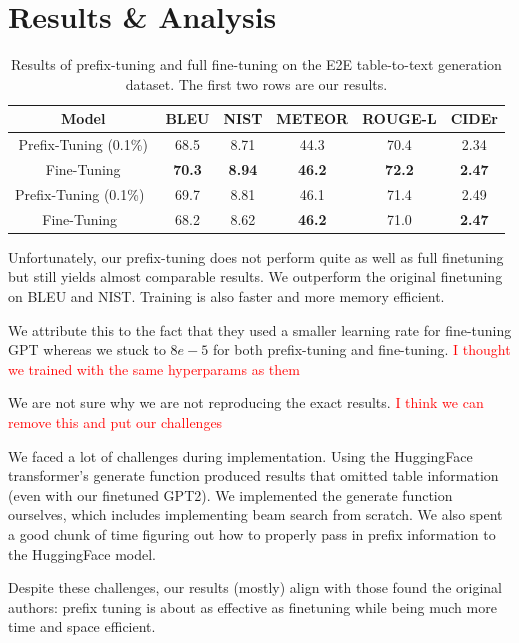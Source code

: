 \documentclass[11pt]{article} %
\begin{document}
\section{Results \& Analysis}

\begin{table}[H]
    \centering
    \begin{tabular}{c|ccccc}
        \textbf{Model} & \textbf{BLEU} & \textbf{NIST} & \textbf{METEOR} & \textbf{ROUGE-L} & \textbf{CIDEr} \\
        \hline
        Prefix-Tuning (0.1\%) & 68.5 & 8.71 & 44.3 & 70.4 & 2.34 \\
        Fine-Tuning & \textbf{70.3} & \textbf{8.94} & \textbf{46.2} & \textbf{72.2} & \textbf{2.47}\\
        Prefix-Tuning (0.1\%)~\cite{li-liang-2021-prefix}  & 69.7 & 8.81 & 46.1 & 71.4 & 2.49 \\
        Fine-Tuning~\cite{li-liang-2021-prefix} & 68.2 & 8.62 & \textbf{46.2} & {71.0} & \textbf{2.47}
    \end{tabular}
    \caption{Results of prefix-tuning and full fine-tuning on the E2E table-to-text generation dataset. The first two rows are our results.}
    \label{tab:results}
\end{table}

Unfortunately, our prefix-tuning does not perform quite as well as full finetuning but still yields almost comparable results. We outperform the original finetuning on BLEU and NIST. Training is also faster and more memory efficient.

We attribute this to the fact that they used a smaller learning rate for fine-tuning GPT whereas we stuck to $8e-5$ for both prefix-tuning and fine-tuning. 
\textcolor{red}{I thought we trained with the same hyperparams as them}

We are not sure why we are not reproducing the exact results. \textcolor{red}{I think we can remove this and put our challenges}

We faced a lot of challenges during implementation. Using the HuggingFace transformer's generate function produced results that omitted table information (even with our finetuned GPT2). We implemented the generate function ourselves, which includes implementing beam search from scratch. We also spent a good chunk of time figuring out how to properly pass in prefix information to the HuggingFace model.

Despite these challenges, our results (mostly) align with those found the original authors: prefix tuning is about as effective as finetuning while being much more time and space efficient.
\end{document}
